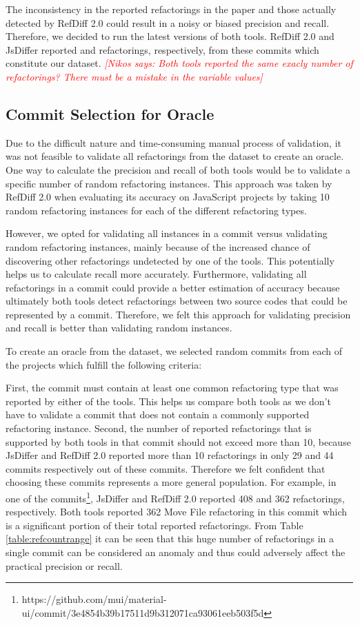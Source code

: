 \documentclass[letterpaper,12pt,onecolumn,final]{report}
\newcommand{\nikos}[1]{\textcolor{red}{{\it [Nikos says: #1]}}}
\begin{document}
The inconsistency in the reported refactorings in the paper and those actually detected by RefDiff 2.0 could result in a noisy or biased precision and recall. Therefore, we decided to run the latest versions of both tools. RefDiff 2.0 and JsDiffer reported \evRefDiffToolTotalRefCount{} and \evJsDifferToolTotalRefCount{} refactorings, respectively, from these \evTotalCommits{} commits which constitute our dataset.
\nikos{Both tools reported the same exacly number of refactorings? There must be a mistake in the variable values}

\subsection {Commit Selection for Oracle}
Due to the difficult nature and time-consuming manual process of validation, it was not feasible to validate all refactorings from the dataset to create an oracle. One way to calculate the precision and recall of both tools would be to validate a specific number of random refactoring instances. This approach was taken by RefDiff 2.0 when evaluating its accuracy on JavaScript projects by taking 10 random refactoring instances for each of the different refactoring types.

However, we opted for validating all instances in a commit versus validating random refactoring instances, mainly because of the increased chance of discovering other refactorings undetected by one of the tools. This potentially helps us to calculate recall more accurately. Furthermore, validating all refactorings in a commit could provide a better estimation of accuracy because ultimately both tools detect refactorings between two source codes that could be represented by a commit. Therefore, we felt this approach for validating precision and recall is better than validating random instances.

To create an oracle from the dataset, we selected \evCompareRandomCommitCount{} random commits from each of the projects which fulfill the following criteria:

First, the commit must contain at least one common refactoring type that was reported by either of the tools. This helps us compare both tools as we don't have to validate a commit that does not contain a commonly supported refactoring instance. Second, the number of reported refactorings that is supported by both tools in that commit should not exceed more than 10, because JsDiffer and RefDiff 2.0 reported more than 10 refactorings in only 29 and 44 commits respectively out of these \evCompareRandomCommitCount{} commits. Therefore we felt confident that choosing these commits represents a more general population. For example, in one of the commits\footnote{https://github.com/mui/material-ui/commit/3e4854b39b17511d9b312071ca93061eeb503f5d}, JsDiffer and RefDiff 2.0 reported 408 and 362 refactorings, respectively. Both tools reported 362 Move File refactoring in this commit which is a significant portion of their total reported refactorings. From Table \ref{table:refcountrange} it can be seen that this huge number of refactorings in a single commit can be considered an anomaly and thus could adversely affect the practical precision or recall.
\end{document}
